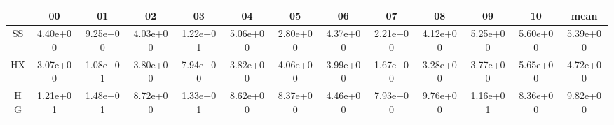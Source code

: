 \centering
\begin{tabular}{|c|c|c|c|c|c|c|c|c|c|c|c|c|}
\hline
 & 00 & 01 & 02 & 03 & 04 & 05 & 06 & 07 & 08 & 09 & 10 & mean \\
\hline
SS & 4.40e+00 & 9.25e+00 & 4.03e+00 & 1.22e+01 & 5.06e+00 & 2.80e+00 & 4.37e+00 & 2.21e+00 & 4.12e+00 & 5.25e+00 & 5.60e+00 & 5.39e+00 \\
\hline
HX & 3.07e+00 & 1.08e+01 & 3.80e+00 & 7.94e+00 & 3.82e+00 & 4.06e+00 & 3.99e+00 & 1.67e+00 & 3.28e+00 & 3.77e+00 & 5.65e+00 & 4.72e+00 \\
\hline
HG & 1.21e+01 & 1.48e+01 & 8.72e+00 & 1.33e+01 & 8.62e+00 & 8.37e+00 & 4.46e+00 & 7.93e+00 & 9.76e+00 & 1.16e+01 & 8.36e+00 & 9.82e+00 \\
\hline
\end{tabular}

